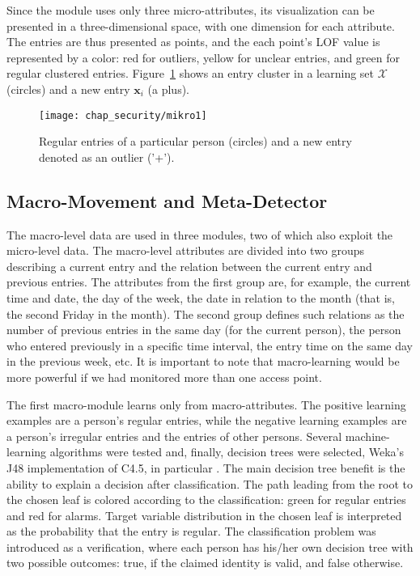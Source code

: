 
Since the module uses only three micro-attributes, its visualization can be presented in a three-dimensional space, with one dimension for each attribute. The entries are thus presented as points, and the each point's LOF value is represented by a color: red for outliers, yellow for unclear entries, and green for regular clustered entries. Figure~\ref{fig:microLOF} shows an entry cluster in a learning set $\mathcal{X}$ (circles) and a new entry $\mathbf{x}_i$ (a plus).


\begin{figure}[]
\centering
\texttt{[image: chap\_security/mikro1]}
\caption{Regular entries of a particular person (circles) and a new entry denoted as an outlier ('+').}
\label{fig:microLOF}
\end{figure}


\subsection{Macro-Movement and Meta-Detector}
\label{sec:modules:macro}

The macro-level data are used in three modules, two of which also exploit the micro-level data. The macro-level attributes are divided into two groups describing a current entry and the relation between the current entry and previous entries. The attributes from the first group are, for example, the current time and date, the day of the week, the date in relation to the month (that is, the second Friday in the month). The second group defines such relations as the number of previous entries in the same day (for the current person), the person who entered previously in a specific time interval, the entry time on the same day in the previous week, etc. 
It is important to note that macro-learning would be more powerful if we had monitored more than one access point.

The first macro-module learns only from macro-attributes. The positive learning examples are a person's regular entries, while the negative learning examples are a person's  irregular entries and the entries of other persons. Several machine-learning algorithms were tested and, finally, decision trees were selected,  Weka's J48 implementation of C4.5, in particular \citep{Witten2005}. The main decision tree benefit is the ability to explain a decision after classification. The path leading from the root to the chosen leaf is colored according to the classification: green for regular entries and red for alarms. Target variable distribution in the chosen leaf is interpreted as the probability that the entry is regular. The classification problem was introduced as a verification, where each person has his/her own decision tree with two possible outcomes: true, if the claimed identity is valid, and false otherwise.

